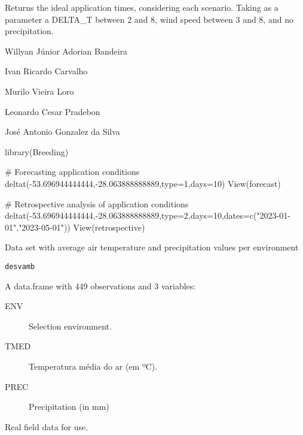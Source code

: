\documentclass[a4paper]{book}
\begin{document}
%
\begin{Value}
Returns the ideal application times, considering each scenario.
Taking as a parameter a DELTA\_T between 2 and 8, wind speed between 3 and 8,
and no precipitation.
\end{Value}
%
\begin{Author}
Willyan Júnior Adorian Bandeira

Ivan Ricardo Carvalho

Murilo Vieira Loro

Leonardo Cesar Pradebon

José Antonio Gonzalez da Silva
\end{Author}
%
\begin{Examples}
\begin{ExampleCode}

library(Breeding)

# Forecasting application conditions
deltat(-53.696944444444,-28.063888888889,type=1,days=10)
View(forecast)

# Retrospective analysis of application conditions
deltat(-53.696944444444,-28.063888888889,type=2,days=10,dates=c("2023-01-01","2023-05-01"))
View(retrospective)

\end{ExampleCode}
\end{Examples}
%
\begin{Description}
Data set with average air temperature and precipitation values per environment
\end{Description}
%
\begin{Usage}
\begin{verbatim}
desvamb
\end{verbatim}
\end{Usage}
%
\begin{Format}
A data.frame with 449 observations and 3 variables:
\begin{description}

\item[ENV] Selection environment.
\item[TMED] Temperatura média do ar (em ºC).
\item[PREC] Precipitation (in mm)

\end{description}

\end{Format}
%
\begin{Source}
Real field data for use.
\end{Source}
\end{document}
